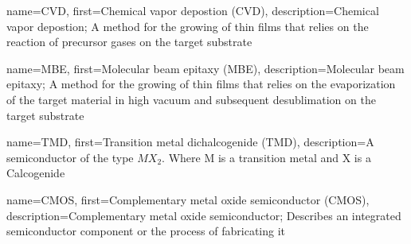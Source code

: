 {
    name={CVD},
    first={Chemical vapor depostion (CVD)},
    description={Chemical vapor depostion; A method for the growing of thin films that relies on the reaction of precursor gases on the target substrate}
}

{
    name={MBE},
    first={Molecular beam epitaxy (MBE)},
    description={Molecular beam epitaxy; A method for the growing of thin films that relies on the evaporization of the target material in high vacuum and subsequent desublimation on the target substrate}
}

{
    name={TMD},
    first={Transition metal dichalcogenide (TMD)},
    description={A semiconductor of the type $MX_{2}$. Where M is a transition metal and X is a Calcogenide}
}

{
    name={CMOS},
    first={Complementary metal oxide semiconductor (CMOS)},
    description={Complementary metal oxide semiconductor; Describes an integrated semiconductor component or the process of fabricating it}
}
